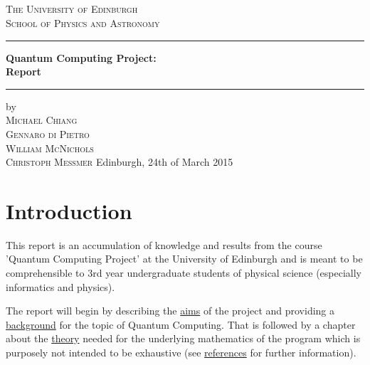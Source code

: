 \documentclass[bibliography=totocnumbered, 10pt]{article}
\title{
 \titlename\\
  \vspace{2cm}
  \vspace{1cm}
}
\author{\authorname}
\date{}
\theoremstyle{NoticeStyle}
\begin{document}
\newpage
\begin{titlepage}
	\centering
	{\LARGE \textsc{The University of Edinburgh}}\\[5pt]
	{\large \textsc{School of Physics and Astronomy}}\\
	\vspace{80pt}
	
	\rule{\linewidth}{1pt}
	{
	\textbf{\LARGE Quantum Computing Project:\\Report}
	}
	\rule{\linewidth}{1pt}
	
	\vspace{80pt}
	{\large
		
	}
	
	\vspace{200pt}
	{\large
	by\\
	\textsc{Michael Chiang\\
	Gennaro di Pietro\\
	William McNichols\\
	Christoph Meßmer}
	}
	\vfill
	{\large Edinburgh, 24th of March 2015}
\end{titlepage}

\newpage


\tableofcontents
\newpage


%
\section{Introduction}
This report is an accumulation of knowledge and results from the course 'Quantum Computing Project' at the University of Edinburgh and is meant to be comprehensible to 3rd year undergraduate students of physical science (especially informatics and physics).

The report will begin by describing the \hyperref[sec:Aims]{aims} of the project and providing a \hyperref[sec:Background]{background} for the topic of Quantum Computing. That is followed by a chapter about the \hyperref[sec:Theory]{theory} needed for the underlying mathematics of the program which is purposely not intended to be exhaustive (see \hyperref[sec:References]{references} for further information).
\end{document}
